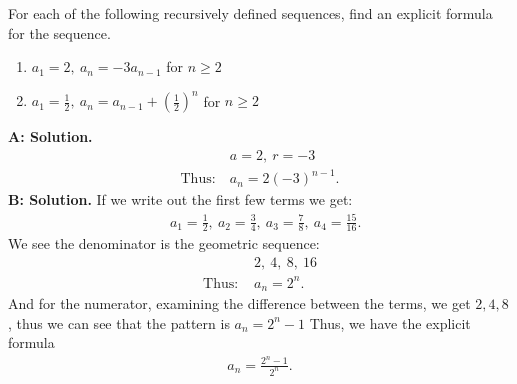 \documentclass{report}
\begin{document}
    \bigbreak \noindent 
    \begin{eg}
       For each of the following recursively defined sequences, find an explicit formula for the sequence.
       \begin{enumerate}[label=(\alph*)]
           \item $a_{1} = 2,\ a_{n} = -3a_{n-1}$ for $n \geq 2 $
            \item $a_{1} = \frac{1}{2},\ a_{n} = a_{n-1} + \left(\frac{1}{2}\right)^{n} $ for $n \geq2 $
       \end{enumerate}
    \end{eg}
    \bigbreak \noindent 
    \textbf{A: Solution.} 
    \begin{align*}
        &a = 2,\ r =-3 \\
        \text{Thus:}\ &a_{n} = 2(-3)^{n-1}
    .\end{align*}
    \bigbreak \noindent 
    \textbf{B: Solution.}
    \bigbreak \noindent 
    If we write out the first few terms we get:
    \begin{align*}
        &a_{1} = \frac{1}{2},\
        a_{2} = \frac{3}{4},\
        a_{3} = \frac{7}{8},\
        a_{4} = \frac{15}{16}
    .\end{align*}
    \bigbreak \noindent 
    We see the denominator is the geometric sequence:
    \begin{align*}
        &2,\ 4,\ 8,\ 16 \\
        \text{Thus: } &a_{n} = 2^{n}
    .\end{align*}
    \bigbreak \noindent 
    And for the numerator, examining the difference between the terms, we get $2,4,8$, thus we can see that the pattern is $a_{n}  = 2^{n}-1$
    \bigbreak \noindent 
    Thus, we have the explicit formula 
    \begin{align*}
        a_{n} = \frac{2^{n}-1}{2^{n}}
    .\end{align*}

    \pagebreak 
\end{document}
